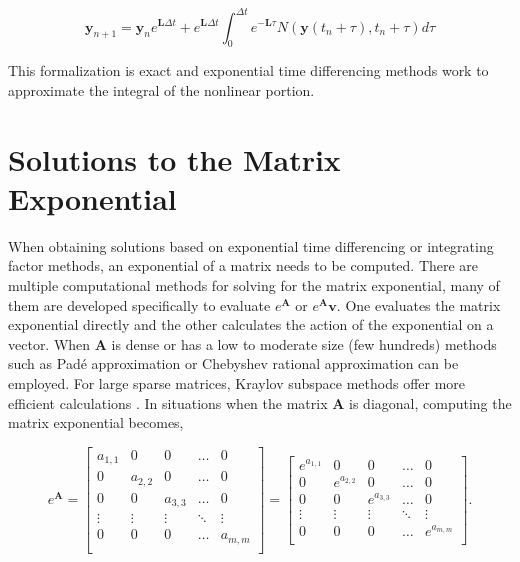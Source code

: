 \begin{equation}
    \boldsymbol{y}_{n+1} = \boldsymbol{y}_{n}e^{\boldsymbol{L}\Delta t} + e^{\boldsymbol{L}\Delta t} \int_{0}^{\Delta t} e^{-\boldsymbol{L}\tau}N(\boldsymbol{y}(t_{n} + \tau), t_{n}+\tau)d\tau
\end{equation}{}

\noindent
This formalization is exact and exponential time differencing methods work to approximate the integral of the nonlinear portion. 

\section{Solutions to the Matrix Exponential}
When obtaining solutions based on exponential time differencing or integrating factor methods, an exponential of a matrix needs to be computed. There are multiple computational methods for solving for the matrix exponential, many of them are developed specifically to evaluate $e^{\boldsymbol{A}}$ or $e^{\boldsymbol{A}}\boldsymbol{v}$. One evaluates the matrix exponential directly and the other calculates the action of the exponential on a vector. When $\boldsymbol{A}$ is dense or has a low to moderate size (few hundreds) methods such as Pad\'e approximation or Chebyshev rational approximation can be employed. For large sparse matrices, Kraylov subspace methods offer more efficient calculations \cite{exokit}. In situations when the matrix $\boldsymbol{A}$ is diagonal, computing the matrix exponential becomes,

$$
e^{\boldsymbol{A}} = 
\begin{bmatrix}
a_{1,1} & 0 & 0 & \hdots & 0 \\
0 & a_{2,2} & 0 & \hdots & 0 \\
0 & 0 & a_{3,3} & \hdots & 0 \\
\vdots & \vdots & \vdots & \ddots & \vdots\\
0 & 0 & 0 & \hdots & a_{m,m} \\
\end{bmatrix}
=
\begin{bmatrix}
e^{a_{1,1}} & 0 & 0 & \hdots & 0 \\
0 & e^{a_{2,2}} & 0 & \hdots & 0 \\
0 & 0 & e^{a_{3,3}} & \hdots & 0 \\
\vdots & \vdots & \vdots & \ddots & \vdots\\
0 & 0 & 0 & \hdots & e^{a_{m,m}} \\
\end{bmatrix}
.
$$

